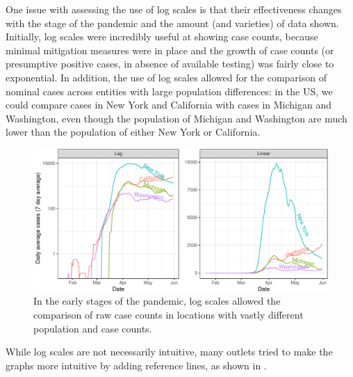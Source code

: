 \documentclass[article]{jdssv}\usepackage[]{graphicx}\usepackage[]{color}
\newenvironment{knitrout}{}{} %
\begin{document}
One issue with assessing the use of log scales is that their effectiveness changes with the stage of the pandemic and the amount (and varieties) of data shown. Initially, log scales were incredibly useful at showing case counts, because minimal mitigation measures were in place and the growth of case counts (or presumptive positive cases, in absence of available testing) was fairly close to exponential. In addition, the use of log scales allowed for the comparison of nominal cases across entities with large population differences: in the US, we could compare cases in New York and California with cases in Michigan and Washington, even though the population of Michigan and Washington are much lower than the population of either New York or California. 

\begin{knitrout}\footnotesize
{}\color{fgcolor}\begin{figure}

{\centering \includegraphics[width=\linewidth]{Figures_R/fig-log-scale-initial-1} 

}

\caption[In the early stages of the pandemic, log scales allowed the comparison of raw case counts in locations with vastly different population and case counts]{In the early stages of the pandemic, log scales allowed the comparison of raw case counts in locations with vastly different population and case counts.}\label{fig:log-scale-initial}
\end{figure}

\end{knitrout}

While log scales are not necessarily intuitive, many outlets tried to make the graphs more intuitive by adding reference lines, as shown in . 
\end{document}
